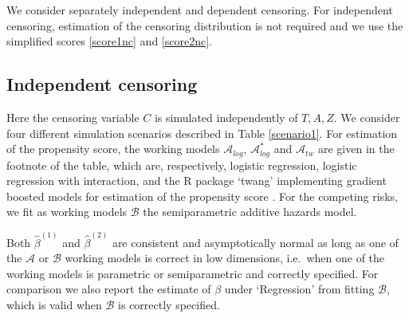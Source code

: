 \documentclass[11pt]{article}
\begin{document}

We consider separately independent and dependent censoring. 
For independent censoring, 
estimation of the censoring distribution is not required and we  use
 the simplified scores \eqref{score1nc} and \eqref{score2nc}.


\subsection{Independent censoring}

Here the censoring variable $C$ is simulated independently of $T,A,Z$. 
We consider four different simulation scenarios described in Table \ref{scenario1}. 
For estimation of the propensity score, the  working models $\mathcal{A}_{log}$, $\mathcal{A}_{log}^{*}$ and  $\mathcal{A}_{tw}$ are given in the footnote of the table, which are, respectively, logistic regression, logistic regression with interaction, and %
 the R package `twang'  implementing  
gradient boosted models  for estimation of the propensity score  \citep{cefalu2021package}.
For the competing risks, we %
fit as working models $\mathcal{B}$ the  semiparametric additive hazards model.

Both $\hat \beta^{(1)}$ and $\hat \beta^{(2)}$ are consistent and asymptotically normal as long as one of the 
 $\mathcal{A}$ or $\mathcal{B}$ working models is correct in low dimensions, i.e.~when one of the working models is parametric or semiparametric and correctly specified. 
 For comparison we also report the estimate of $\beta$ under `Regression' from fitting $\mathcal{B}$, which is valid when $\mathcal{B}$ is correctly specified. 
\end{document}
